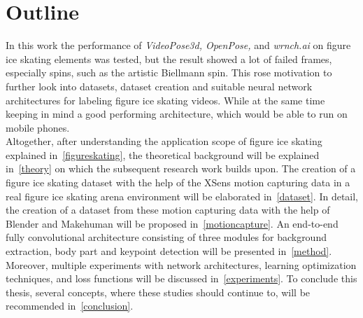     \section{Outline}
    In this work the performance of \textit{VideoPose3d, OpenPose,} and \textit{wrnch.ai} on figure ice skating elements was tested,
but the result showed a lot of failed frames, especially spins, such as the artistic Biellmann spin.
This rose motivation to further look into datasets, dataset creation and suitable neural network architectures for labeling
figure ice skating videos. While at the same time keeping in mind a good performing architecture, which would be able to run on mobile phones.\\
Altogether, after understanding the application scope of figure ice skating explained in~\autoref{figureskating}, the theoretical
background will be explained in~\autoref{theory} on which the subsequent research work builds upon.
The creation of a figure ice skating dataset with the help of the XSens motion capturing data in a
    real figure ice skating arena
    environment will be elaborated in~\autoref{dataset}.
    In detail, the creation of a dataset from these motion capturing data with the help of Blender and
    Makehuman will be proposed in~\autoref{motioncapture}.
    An end-to-end fully convolutional architecture consisting of three modules for background extraction,
    body part and keypoint detection will be presented in~\autoref{method}.
    Moreover, multiple experiments with network architectures, learning optimization techniques, and loss functions will be discussed
    in~\autoref{experiments}.
    To conclude this thesis, several concepts, where these studies should continue to, will be recommended in~\autoref{conclusion}.




